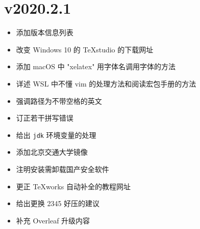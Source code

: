\section*{v2020.2.1}

\begin{itemize}
    \item 添加版本信息列表
    \item 改变 Windows 10 的 \TeX studio 的下载网址
    \item 添加 macOS 中 "xelatex" 用字体名调用字体的方法
    \item 详述 WSL 中不懂 \textsf{vim} 的处理方法和阅读宏包手册的方法
    \item 强调路径为不带空格的英文
    \item 订正若干拼写错误
    \item 给出 \texttt{jdk} 环境变量的处理
    \item 添加北京交通大学镜像
    \item 注明安装需卸载国产安全软件
    \item 更正 \TeX works 自动补全的教程网址
    \item 给出更换 2345 好压的建议
    \item 补充 Overleaf 升级内容
\end{itemize}
